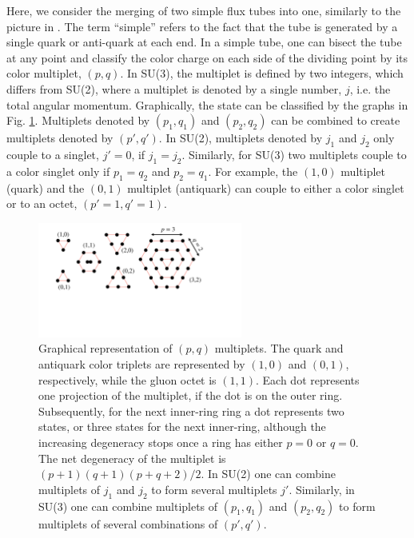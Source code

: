 \documentclass[aps, prc, 12pt, nofootinbib, showpacs, superscriptaddress, tightenlines, groupedaddress]{revtex4-2}
\begin{document}
Here, we consider the merging of two simple flux tubes into one, similarly to the picture in \cite{Vance:1997th}. The term ``simple'' refers to the fact that the tube is generated by a single quark or anti-quark at each end. In a simple tube, one can bisect the tube at any point and classify the color charge on each side of the dividing point by its color multiplet, $(p,q)$. In SU(3), the multiplet is defined by two integers, which differs from SU(2), where a multiplet is denoted by a single number, $j$, i.e. the total angular momentum. Graphically, the state can be classified by the graphs in Fig. \ref{fig:pqmultiplet}. Multiplets denoted by $(p_1,q_1)$ and $(p_2,q_2)$ can be combined to create multiplets denoted by $(p',q')$. In SU(2), multiplets denoted by $j_1$ and $j_2$ only couple to a singlet, $j'=0$, if $j_1=j_2$. Similarly, for SU(3) two multiplets couple to a color singlet only if $p_1=q_2$ and $p_2=q_1$. For example, the $(1,0)$ multiplet (quark) and the $(0,1)$ multiplet (antiquark) can couple to either a color singlet or to an octet, $(p'=1,q'=1)$.
\begin{figure}
\centerline{\includegraphics[width=0.6\textwidth]{figs/pqmultiplet.pdf}}
\caption{\label{fig:pqmultiplet}
Graphical representation of $(p,q)$ multiplets. The quark and antiquark color triplets are represented by $(1,0)$ and $(0,1)$, respectively, while the gluon octet is $(1,1)$. Each dot represents one projection of the multiplet, if the dot is on the outer ring. Subsequently, for the next inner-ring ring a dot represents two states, or three states for the next inner-ring, although the increasing degeneracy stops once a ring has either $p=0$ or $q=0$. The net degeneracy of the multiplet is $(p+1)(q+1)(p+q+2)/2$. In SU(2) one can combine multiplets of $j_1$ and $j_2$ to form several multiplets $j'$. Similarly, in SU(3) one can combine multiplets of $(p_1,q_1)$ and $(p_2,q_2)$ to form multiplets of several combinations of $(p',q')$.
}
\end{figure}
\end{document}
